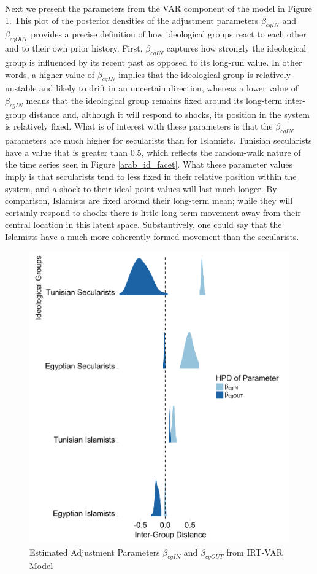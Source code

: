 \documentclass[12pt]{article}
\begin{document}
Next we present the parameters from the VAR component of the model in Figure \ref{varparam}. This plot of the posterior densities of the adjustment parameters $\beta_{cgIN}$ and $\beta_{cgOUT}$ provides a precise definition of how ideological groups react to each other and to their own prior history. First, $\beta_{cgIN}$ captures how strongly the ideological group is influenced by its recent past as opposed to its long-run value. In other words, a higher value of  $\beta_{cgIN}$ implies that the ideological group is relatively unstable and likely to drift in an uncertain direction, whereas a lower value of $\beta_{cgIN}$ means that the ideological group remains fixed around its long-term inter-group distance and, although it will respond to shocks, its position in the system is relatively fixed. What is of interest with these parameters is that the $\beta_{cgIN}$ parameters are much higher for secularists than for Islamists. Tunisian secularists have a value that is greater than 0.5, which reflects the random-walk nature of the time series seen in Figure \ref{arab_id_facet}. What these parameter values imply is that secularists tend to less fixed in their relative position within the system, and a shock to their ideal point values will last much longer. By comparison, Islamists are fixed around their long-term mean; while they will certainly respond to shocks there is little long-term movement away from their central location in this latent space. Substantively, one could say that the Islamists have a much more coherently formed movement than the secularists.
 \begin{figure}[!h]
	\centering
	\caption{Estimated Adjustment Parameters $\beta_{cgIN}$ and $\beta_{cgOUT}$ from IRT-VAR Model}\label{varparam}
	\centering
	\includegraphics[width=.9\linewidth]{adj_par}
\end{figure}
\end{document}
